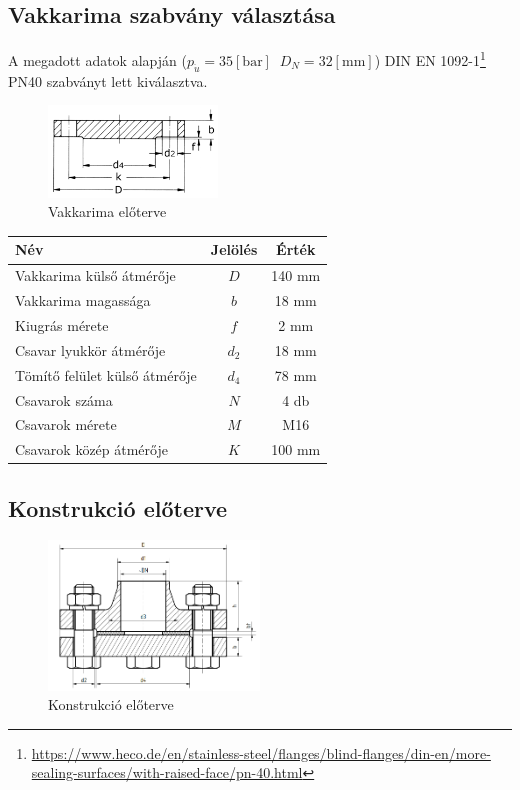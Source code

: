 \documentclass[10pt, a4paper]{article}
\newcommand{\baar}{\mathrm{\left[bar\right]}}
\newcommand{\mm}{\mathrm{\left[mm\right]}}
\begin{document}
	\subsection{Vakkarima szabvány választása}
	A megadott adatok alapján ($p_{\ddot{u}} = 35\baar\;\;D_N = 32\mm$) DIN EN 1092-1\footnote{\url{https://www.heco.de/en/stainless-steel/flanges/blind-flanges/din-en/more-sealing-surfaces/with-raised-face/pn-40.html}} PN40 szabványt lett kiválasztva.
	\begin{figure}[h]
		\centering
		\includegraphics[width=0.4\textwidth]{ vakkarima_eloterv.png }
		\caption{Vakkarima előterve}
		\label{fig:vakkarima}
	\end{figure}
	\renewcommand{\arraystretch}{1.4}
	\begin{table}[h]
		\centering
		\begin{tabular}{l|c|c}
			\textbf{Név}                              & \textbf{Jelölés} & \textbf{Érték} \\ \hline
			Vakkarima külső átmérője                     & $D$                & 140 mm           \\
			Vakkarima magassága                          & $b$                & 18 mm			\\
			Kiugrás mérete                            & $f$                & 2 mm           \\
			Csavar lyukkör átmérője                   & $d_2$             & 18 mm           \\
			Tömítő felület külső átmérője             & $d_4$             & 78 mm           \\
			Csavarok száma                            & $N$                & 4 db           \\
			Csavarok mérete                           & $M$                & M16          \\ 
			Csavarok közép átmérője                   & $K$                & 100 mm             
		\end{tabular}
	\end{table}
	\subsection{Konstrukció előterve}
	\begin{figure}[h]
			\centering
			\includegraphics[width=0.5\textwidth]{ konstrukcio_eloterv.png }
			\caption{Konstrukció előterve}
			\label{fig:konstrukcio}
		\end{figure}
	\newpage
\end{document}
